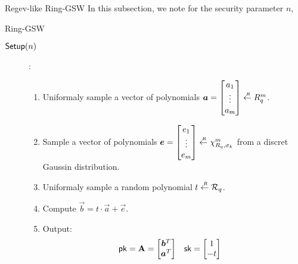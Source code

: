 \begin{subsection}{Regev-like Ring-GSW}
  In this subsection, we note for the security parameter $n$,
  \begin{paragraph}{Ring-GSW}
    \begin{description}
    \item[${\mathsf{Setup}}(n)$]:
      \begin{enumerate}
      \item Uniformaly sample a vector of polynomials $\vec{a} = \begin{bmatrix} a_1 \\ \vdots \\ a_m \end{bmatrix} \sample R_q^m$.
      \item Sample a vector of polynomials $\vec{e} = \begin{bmatrix} e_1 \\ \vdots \\ e_m \end{bmatrix} \sample \chi_{R_q, \sigma_k}^m$ from a discret Gaussin distribution.
      \item Uniformaly sample a random polynomial $t \stackrel{{\scriptscriptstyle \mkern4mu R}}{\gets} {\mathcal{R}}_q$.
      \item Compute $\vec{b} = t \cdot \vec{a} + \vec{e}$.
      \item Output:
        \begin{align*}
          \pk &= \mat{A} = \begin{bmatrix} \vec{b}^T \\ \vec{a}^T \end{bmatrix} & \sk &= \begin{bmatrix} 1 \\ -t\end{bmatrix}
        \end{align*}
      \end{enumerate}

\end{description}
\end{paragraph}
\end{subsection}
